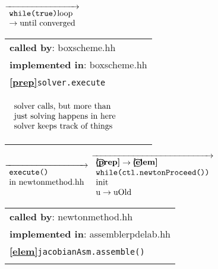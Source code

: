 \begin{landscape}
{\begin{tabular}{|l|}
  \end{tabular}
    {\scriptsize$\overrightarrow{
      \begin{array}{l}
	\textnormal{\texttt{while(true)}loop} \\
	\rightarrow \textnormal{until converged}
      \end{array} } $}
    \begin{tabular}{|l|}
      \hline
      \textbf{called by}: boxscheme.hh\\
      \textbf{implemented in}: boxscheme.hh\\  
      \textbf{\textcircled{\ref{prep}}}\verb+solver.execute+ \\
    \begin{scriptsize}$\begin{array}{l}
	\textnormal{solver calls, but more than} \\ 
	\textnormal{just solving happens in here} \\
	\textnormal{solver keeps track of things}
      \end{array}$\end{scriptsize}\\\hline
  \end{tabular}
\nextline
    {\scriptsize$\overrightarrow{ \begin{array}{l}
                                  \texttt{execute()}\\
				  \textnormal{in newtonmethod.hh}
                                 \end{array}
    }$
    $\overrightarrow{ \begin{array}{l}
				  \textbf{\textcircled{\ref{prep}}} \rightarrow \textbf{\textcircled{\ref{elem}}}\\
                                  \texttt{while(ctl.newtonProceed())}\\
				  \textnormal{init}\\
				  \textnormal{u} \rightarrow \textnormal{uOld}
                                 \end{array}
    }$}
    \begin{tabular}{|l|}
      \hline
      \textbf{called by}: newtonmethod.hh\\
      \textbf{implemented in}: assemblerpdelab.hh\\  
      \textbf{\textcircled{\ref{elem}}}\verb+jacobianAsm.assemble()+ \\
    \begin{scriptsize}\end{scriptsize}\\\hline

\end{tabular}}
\end{landscape}

